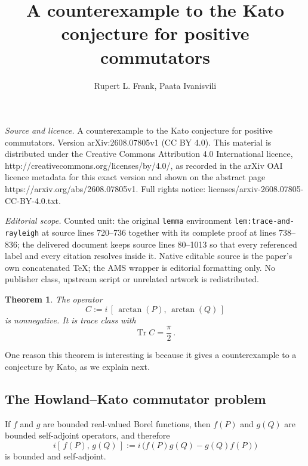 \documentclass[10pt,a4paper]{amsart}
\newtheorem{theorem}{Theorem}
\begin{document}
\title[A counterexample to the Kato conjecture for positive commuta]{A counterexample to the Kato conjecture for positive commutators}
\author{Rupert L. Frank, Paata Ivanisvili}
\date{}
\maketitle
\noindent\emph{Source and licence.} A counterexample to the Kato conjecture for positive commutators. Version arXiv:2608.07805v1 (CC BY 4.0). This material is distributed under the Creative Commons Attribution 4.0 International licence, http://creativecommons.org/licenses/by/4.0/, as recorded in the arXiv OAI licence metadata for this exact version and shown on the abstract page https://arxiv.org/abs/2608.07805v1. Full rights notice: licenses/arxiv-2608.07805-CC-BY-4.0.txt.\par\smallskip
\noindent\textit{Editorial scope.} Counted unit: the original \texttt{lemma} environment \texttt{lem:trace-and-rayleigh} at source lines 720--736 together with its complete proof at lines 738--836; the delivered document keeps source lines 80--1013 so that every referenced label and every citation resolves inside it. Native editable source is the paper's own concatenated TeX; the AMS wrapper is editorial formatting only. No publisher class, upstream script or unrelated artwork is redistributed.
\begin{theorem}\label{thm:main}
The operator
\begin{equation}\label{eq:main-positive}
C:=i\,[\,\arctan(P),\,\arctan(Q)\,]
\end{equation}
is nonnegative. It is trace class with
\begin{equation}\label{eq:trace-main}
\operatorname{Tr} C=\frac{\pi}{2} \,.
\end{equation}
\end{theorem}

One reason this theorem is interesting is because it gives a counterexample to a conjecture by Kato, as we explain next.


\subsection*{The Howland--Kato commutator problem}

If $f$ and $g$ are bounded real-valued Borel functions, then $f(P)$ and $g(Q)$ are bounded self-adjoint operators, and therefore
\[
i[\,f(P),\, g(Q)\,]:=i\,\bigl(f(P)g(Q)-g(Q)f(P)\bigr)
\]
is bounded and self-adjoint. 
\end{document}
